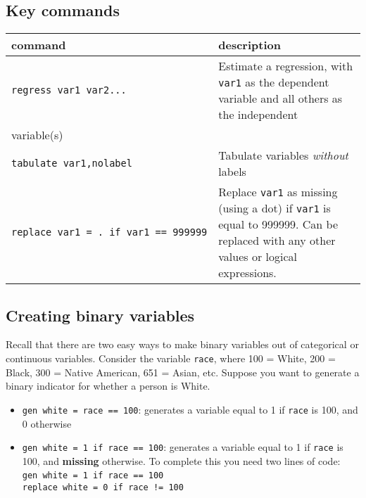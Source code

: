 \documentclass[11pt]{article}
\begin{document}
\hypertarget{key-commands}{%
\subsection*{Key commands}\label{key-commands}}

\begin{longtable}[]{@{}
  >{\raggedright\arraybackslash}p{}
  >{\raggedleft\arraybackslash}p{}@{}}
\toprule
command & description \\
\midrule
\endhead
\texttt{regress\ var1\ var2...} & Estimate a regression, with
\texttt{var1} as the dependent variable and all others as the
independent \\
variable(s) & \\
\texttt{tabulate\ var1,nolabel} & Tabulate variables \emph{without}
labels \\
\texttt{replace\ var1\ =\ .\ if\ var1\ ==\ 999999} & Replace
\texttt{var1} as missing (using a dot) if \texttt{var1} is equal to
999999. Can be replaced with any other values or logical expressions. \\
\bottomrule
\end{longtable}

\hypertarget{creating-binary-variables}{%
\subsection*{Creating binary
variables}\label{creating-binary-variables}}

Recall that there are two easy ways to make binary variables out of
categorical or continuous variables. Consider the variable
\texttt{race}, where 100 = White, 200 = Black, 300 = Native American,
651 = Asian, etc. Suppose you want to generate a binary indicator for
whether a person is White.

\begin{itemize}
\item
  \texttt{gen\ white\ =\ race\ ==\ 100}: generates a variable equal to 1
  if \texttt{race} is 100, and 0 otherwise
\item
  \texttt{gen\ white\ =\ 1\ if\ race\ ==\ 100}: generates a variable
  equal to 1 if \texttt{race} is 100, and \textbf{missing} otherwise. To
  complete this you need two lines of code:\\
  \texttt{gen\ white\ =\ 1\ if\ race\ ==\ 100}~\\
  \texttt{replace\ white\ =\ 0\ if\ race\ !=\ 100}
\end{itemize}
\end{document}

